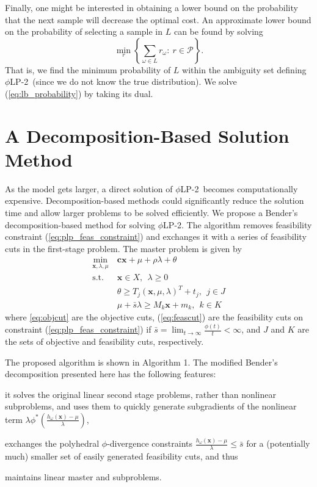 \documentclass[opre,nonblindrev]{informs3} %
\newcommand{\x}{\mathbf{x}}
\renewcommand{\c}{\mathbf{c}}
\newcommand{\st}{\mbox{s.t.}}
\newcommand{\plp}{$\phi$LP-2}
\begin{document}
Finally, one might be interested in obtaining a lower bound on the probability that the next sample will decrease the optimal cost.
An approximate lower bound on the probability of selecting a sample in $L$ can be found by solving
\begin{equation}
	\min_{r} \left\{ \sum_{\omega \in L} r_\omega \colon\ r \in \mathcal{P} \right\}. \label{eq:lb_probability}
\end{equation}
That is, we find the minimum probability of $L$ within the ambiguity set defining \plp\ (since we do not know the true distribution).
We solve (\ref{eq:lb_probability}) by taking its dual.



\section{A Decomposition-Based Solution Method}
\label{sec:soln_algorithm}

As the model gets larger, a direct solution of \plp\ becomes computationally expensive.
Decomposition-based methods could significantly reduce the solution time and allow larger problems to be solved efficiently. We propose a Bender's decomposition-based method for solving \plp.
The algorithm removes feasibility constraint (\ref{eq:plp_feas_constraint})  and exchanges it with a series of feasibility cuts in the first-stage problem.
The master problem is given by
\begin{align}
	\min_{\x,\lambda,\mu} \ & \c\x + \mu + \rho \lambda + \theta \label{eq:master_problem}\\
	\st \ & \x \in X,\ \ \lambda \geq 0 \nonumber  \\
	& \theta \geq T_j (\x,\mu,\lambda)^T + t_j, \ \  j \in J  \label{eq:objcut} \\
	& \mu + \bar{s}\lambda \geq M_k \x + m_k, \ \ k \in K \label{eq:feascut}
\end{align}
where \eqref{eq:objcut} are the objective cuts, (\ref{eq:feascut}) are the feasibility cuts on constraint (\ref{eq:plp_feas_constraint}) if $\bar{s} = \lim_{t \rightarrow \infty} \frac{\phi(t)}{t} < \infty$, and $J$ and $K$ are the sets of objective and feasibility cuts, respectively.

The proposed algorithm is shown in Algorithm 1.
The modified Bender's decomposition presented here has the following features:
\begin{inparaenum}
	\item it solves the original linear second stage problems, rather than nonlinear subproblems, and uses them to quickly generate subgradients of the nonlinear term $\lambda \phi^*\left(\tfrac{h_\omega(\x) - \mu}{\lambda}\right)$, 
	\item exchanges the polyhedral $\phi$-divergence constraints $\tfrac{h_\omega(\x) - \mu}{\lambda} \leq \bar{s}$ for a (potentially much) smaller set of easily generated feasibility cuts, and thus
	\item  maintains linear master and subproblems.\medskip
\end{inparaenum}
\end{document}
